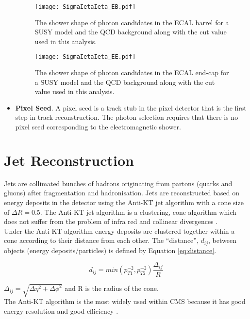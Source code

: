 \begin{itemize}
\begin{figure}
\begin{center}
\texttt{[image: SigmaIetaIeta\_EB.pdf]}
\end{center}
\caption{The shower shape of photon candidates in the ECAL barrel for a SUSY 
model and the QCD background along with the cut value used in this analysis.} 
\label{fig:SigmaIetaIeta_EB}
\end{figure}

\begin{figure}
\begin{center}
\texttt{[image: SigmaIetaIeta\_EE.pdf]}
\end{center}
\caption{The shower shape of photon candidates in the ECAL end-cap for a SUSY 
model and the QCD background along with the cut value used in this analysis.} 
\label{fig:SigmaIetaIeta_EE}
\end{figure}

\item {\bf Pixel Seed}. A pixel seed is a track stub in the pixel detector that 
is the first step in track reconstruction. The photon selection requires that 
there is no pixel seed corresponding to the electromagnetic shower.
\end{itemize}

\section{Jet Reconstruction}

Jets are collimated bunches of hadrons originating from partons (quarks and 
gluons) after fragmentation and hadronisation. Jets are reconstructed based on 
energy deposits in the detector using the Anti-KT jet algorithm with a cone 
size of $\Delta R = 0.5$. The Anti-KT jet algorithm is a clustering, cone 
algorithm which does not suffer from the problem of infra red and collinear 
divergences \cite{antikt}. \\

Under the Anti-KT algorithm energy deposits are clustered together within a cone
according to their distance from each other. The ``distance'', $d_{ij}$, between 
objects (energy deposits/particles) is defined by Equation \ref{eq:distance}.

\begin{equation}
d_{ij} = min(p_{T1}^{-2}, p_{T2}^{-2})\frac{\Delta_{ij}}{R}
\label{eq:distance}
\end{equation}

$\Delta_{ij} = \sqrt{\Delta \eta^{2} + \Delta \phi^{2}}$ and R is the radius of
the cone. \\

The Anti-KT algorithm is the most widely used within CMS because it has good
energy resolution and good efficiency \cite{ak5best}.

